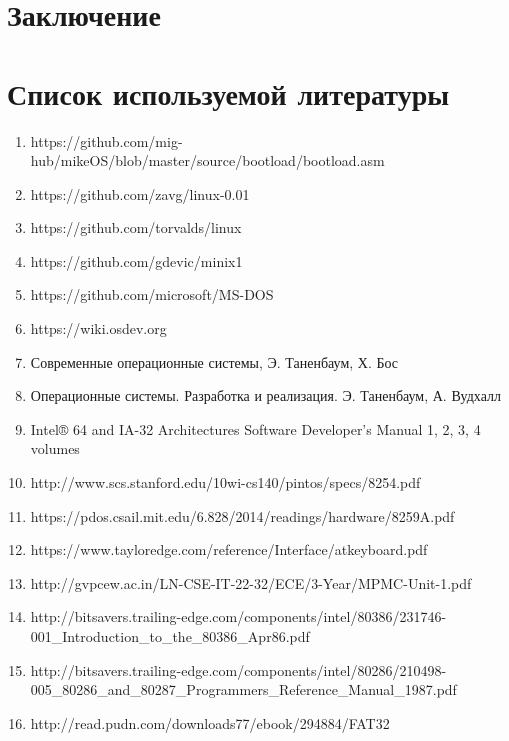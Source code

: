 \documentclass[12pt]{article}
\begin{document}
\newpage
\section{Заключение}
\newpage

\section{Список используемой литературы}
\begin{enumerate}[leftmargin=2\parindent]
	\item https://github.com/mig-hub/mikeOS/blob/master/source/bootload/bootload.asm
	\item https://github.com/zavg/linux-0.01
	\item https://github.com/torvalds/linux
	\item https://github.com/gdevic/minix1
	\item https://github.com/microsoft/MS-DOS
	\item https://wiki.osdev.org
	\item Современные операционные системы, Э. Таненбаум, Х. Бос
	\item Операционные системы. Разработка и реализация. Э. Таненбаум, А. Вудхалл
	\item Intel® 64 and IA-32 Architectures Software Developer’s Manual 1, 2, 3, 4 volumes
	\item http://www.scs.stanford.edu/10wi-cs140/pintos/specs/8254.pdf
	\item https://pdos.csail.mit.edu/6.828/2014/readings/hardware/8259A.pdf
	\item https://www.tayloredge.com/reference/Interface/atkeyboard.pdf
	\item http://gvpcew.ac.in/LN-CSE-IT-22-32/ECE/3-Year/MPMC-Unit-1.pdf
	\item http://bitsavers.trailing-edge.com/components/intel/80386/231746-001\_Introduction\_to\_the\_80386\_Apr86.pdf
	\item http://bitsavers.trailing-edge.com/components/intel/80286/210498-005\_80286\_and\_80287\_Programmers\_Reference\_Manual\_1987.pdf
	\item http://read.pudn.com/downloads77/ebook/294884/FAT32%
\end{enumerate}
\end{document}
